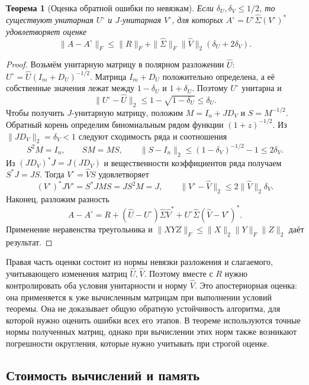 \documentclass[a4paper,12pt]{article}
\theoremstyle{csstyle}
\newtheorem{theorem}{Теорема}[section]
\begin{document}
\begin{theorem}[Оценка обратной ошибки по невязкам]
\label{th:bw-structured}
Если $\delta_U,\delta_V\le1/2$, то существуют унитарная $U^\circ$
и $J$-унитарная $V^\circ$, для которых
$A^\circ=U^\circ\widehat\Sigma(V^\circ)^*$ удовлетворяет оценке
\begin{equation}\label{eq:bw-absolute}
\|A-A^\circ\|_F\le\|R\|_F+
\|\widehat\Sigma\|_F\|\widehat V\|_2
(\delta_U+2\delta_V).
\end{equation}
\end{theorem}
\begin{proof}
Возьмём унитарную матрицу в полярном разложении $\widehat U$:
$U^\circ=\widehat U(I_m+D_U)^{-1/2}$.
Матрица $I_m+D_U$ положительно определена, а её собственные значения
лежат между $1-\delta_U$ и $1+\delta_U$. Поэтому $U^\circ$ унитарна и
\[
\|U^\circ-\widehat U\|_2
\le1-\sqrt{1-\delta_U}\le\delta_U.
\]
Чтобы получить $J$-унитарную матрицу, положим $M=I_n+JD_V$ и $S=M^{-1/2}$.
Обратный корень определим биномиальным рядом функции $(1+z)^{-1/2}$.
Из $\|JD_V\|_2=\delta_V<1$ следуют сходимость ряда и соотношения
\[
S^2M=I_n,\qquad SM=MS,\qquad
\|S-I_n\|_2\le(1-\delta_V)^{-1/2}-1\le2\delta_V.
\]
Из $(JD_V)^*J=J(JD_V)$ и вещественности коэффициентов ряда получаем
$S^*J=JS$. Тогда $V^\circ=\widehat VS$ удовлетворяет
\[
(V^\circ)^*JV^\circ=S^*JMS=JS^2M=J,\qquad
\|V^\circ-\widehat V\|_2\le2\|\widehat V\|_2\delta_V.
\]
Наконец, разложим разность
\[
A-A^\circ=R+(\widehat U-U^\circ)\widehat\Sigma\widehat V^*
+U^\circ\widehat\Sigma(\widehat V-V^\circ)^*.
\]
Применение неравенства треугольника и
$\|XYZ\|_F\le\|X\|_2\|Y\|_F\|Z\|_2$ даёт результат.
\end{proof}

Правая часть оценки состоит из нормы невязки разложения и слагаемого,
учитывающего изменения матриц $\widehat U,\widehat V$. Поэтому вместе с $R$ нужно контролировать
оба условия унитарности и норму $\widehat V$.
Это апостериорная оценка: она применяется к уже вычисленным матрицам
при выполнении условий теоремы. Она не доказывает общую обратную
устойчивость алгоритма, для которой нужно оценить ошибки всех его этапов.
В теореме используются точные нормы полученных матриц, однако при вычислении
этих норм также возникают погрешности округления, которые нужно учитывать при строгой оценке.

\subsection{Стоимость вычислений и память}
\end{document}
